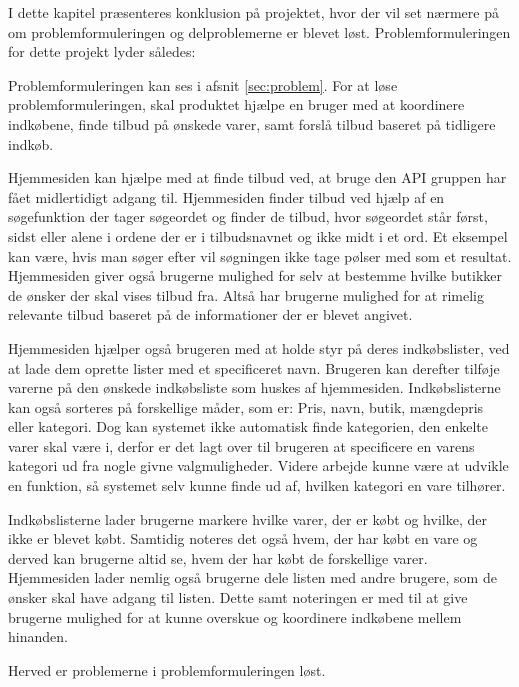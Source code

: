 I dette kapitel præsenteres konklusion på projektet, hvor der vil set nærmere på om problemformuleringen og delproblemerne er blevet løst.
Problemformuleringen for dette projekt lyder således: 

\textbf{} 

Problemformuleringen kan ses i afsnit \ref{sec:problem}. For at løse problemformuleringen, skal produktet hjælpe en bruger med at koordinere indkøbene, finde tilbud på ønskede varer, samt forslå tilbud baseret på tidligere indkøb.

Hjemmesiden kan hjælpe med at finde tilbud ved, at bruge den API gruppen har fået midlertidigt adgang til. Hjemmesiden finder tilbud ved hjælp af en søgefunktion der tager søgeordet og finder de tilbud, hvor søgeordet står først, sidst eller alene i ordene der er i tilbudsnavnet og ikke midt i et ord. Et eksempel kan være, hvis man søger efter  vil søgningen ikke tage pølser med som et resultat. Hjemmesiden giver også brugerne mulighed for selv at bestemme hvilke butikker de ønsker der skal vises tilbud fra. Altså har brugerne mulighed for at rimelig relevante tilbud baseret på de informationer der er blevet angivet.

Hjemmesiden hjælper også brugeren med at holde styr på deres indkøbslister, ved at lade dem oprette lister med et specificeret navn. Brugeren kan derefter tilføje varerne på den ønskede indkøbsliste som huskes af hjemmesiden. Indkøbslisterne kan også sorteres på forskellige måder, som er: Pris, navn, butik, mængdepris eller kategori. Dog kan systemet ikke automatisk finde kategorien, den enkelte varer skal være i, derfor er det lagt over til brugeren at specificere en varens kategori ud fra nogle givne valgmuligheder. Videre arbejde kunne være at udvikle en funktion, så systemet selv kunne finde ud af, hvilken kategori en vare tilhører.

Indkøbslisterne lader brugerne markere hvilke varer, der er købt og hvilke, der ikke er blevet købt. Samtidig noteres det også hvem, der har købt en vare og derved kan brugerne altid se, hvem der har købt de forskellige varer.
Hjemmesiden lader nemlig også brugerne dele listen med andre brugere, som de ønsker skal have adgang til listen. Dette samt noteringen er med til at give brugerne mulighed for at kunne overskue og koordinere indkøbene mellem hinanden.

Herved er problemerne i problemformuleringen løst.